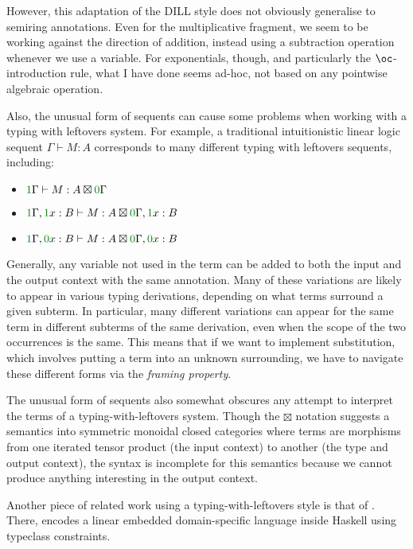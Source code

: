 However, this adaptation of the DILL style does not obviously generalise to
semiring annotations.
Even for the multiplicative fragment, we seem to be working against the
direction of addition, instead using a subtraction operation whenever we use a
variable.
For exponentials, though, and particularly the $\oc$-introduction rule, what I
have done seems ad-hoc, not based on any pointwise algebraic operation.

Also, the unusual form of sequents can cause some problems when working with a
typing with leftovers system.
For example, a traditional intuitionistic linear logic sequent
$\Gamma \vdash M : A$ corresponds to many different typing with leftovers
sequents, including:
\begin{itemize}
  \item $\gr1\Gamma \vdash M : A \boxtimes \gr0\Gamma$
  \item $\gr1\Gamma, \gr1x : B \vdash M : A \boxtimes \gr0\Gamma, \gr1x : B$
  \item $\gr1\Gamma, \gr0x : B \vdash M : A \boxtimes \gr0\Gamma, \gr0x : B$
\end{itemize}

Generally, any variable not used in the term can be added to both the input and
the output context with the same annotation.
Many of these variations are likely to appear in various typing derivations,
depending on what terms surround a given subterm.
In particular, many different variations can appear for the same term in
different subterms of the same derivation, even when the scope of the two
occurrences is the same.
This means that if we want to implement substitution, which involves putting a
term into an unknown surrounding, we have to navigate these different forms via
the \emph{framing property}.

The unusual form of sequents also somewhat obscures any attempt to interpret the
terms of a typing-with-leftovers system.
Though the $\boxtimes$ notation suggests a semantics into symmetric monoidal
closed categories where terms are morphisms from one iterated tensor product
(the input context) to another (the type and output context), the syntax is
incomplete for this semantics because we cannot produce anything interesting in
the output context.

Another piece of related work using a typing-with-leftovers style is that of
\citet{polakow15}.
There, \citeauthor{polakow15} encodes a linear embedded domain-specific language
inside Haskell using typeclass constraints.

